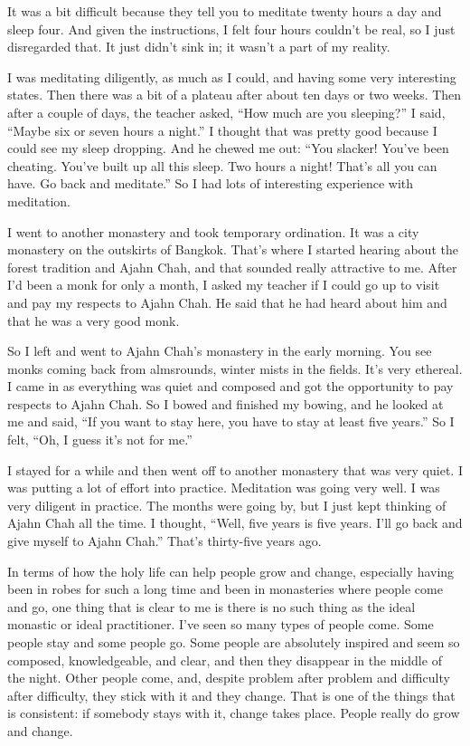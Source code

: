 It was a bit difficult because they tell you to meditate twenty hours a
day and sleep four. And given the instructions, I felt four hours
couldn’t be real, so I just disregarded that. It just didn’t sink in; it
wasn’t a part of my reality.

I was meditating diligently, as much as I could, and having some very
interesting states. Then there was a bit of a plateau after about ten
days or two weeks. Then after a couple of days, the teacher asked, “How
much are you sleeping?” I said, “Maybe six or seven hours a night.” I
thought that was pretty good because I could see my sleep dropping. And
he chewed me out: “You slacker! You’ve been cheating. You’ve built up
all this sleep. Two hours a night! That’s all you can have. Go back and
meditate.” So I had lots of interesting experience with meditation.

I went to another monastery and took temporary ordination. It was a city
monastery on the outskirts of Bangkok. That’s where I started hearing
about the forest tradition and Ajahn Chah, and that sounded really
attractive to me. After I’d been a monk for only a month, I asked my
teacher if I could go up to visit and pay my respects to Ajahn Chah. He
said that he had heard about him and that he was a very good monk.

So I left and went to Ajahn Chah’s monastery in the early morning. You
see monks coming back from almsrounds, winter mists in the fields. It’s
very ethereal. I came in as everything was quiet and composed and got
the opportunity to pay respects to Ajahn Chah. So I bowed and finished
my bowing, and he looked at me and said, “If you want to stay here, you
have to stay at least five years.” So I felt, “Oh, I guess it’s not for
me.”

I stayed for a while and then went off to another monastery that was
very quiet. I was putting a lot of effort into practice. Meditation was
going very well. I was very diligent in practice. The months were going
by, but I just kept thinking of Ajahn Chah all the time. I thought,
“Well, five years is five years. I’ll go back and give myself to Ajahn
Chah.” That’s thirty-five years ago.

In terms of how the holy life can help people grow and change,
especially having been in robes for such a long time and been in
monasteries where people come and go, one thing that is clear to me is
there is no such thing as the ideal monastic or ideal practitioner. I’ve
seen so many types of people come. Some people stay and some people go.
Some people are absolutely inspired and seem so composed, knowledgeable,
and clear, and then they disappear in the middle of the night. Other
people come, and, despite problem after problem and difficulty after
difficulty, they stick with it and they change. That is one of the
things that is consistent: if somebody stays with it, change takes
place. People really do grow and change.

